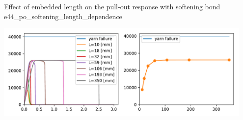 \documentclass[main.tex]{subfiles}
\begin{document}
\begin{bmcsex}{Effect of embedded length on the pull-out response with softening bond
    }{e44_po_softening_length_dependence}
\begin{center}
    \includegraphics[width=0.95\textwidth]{examples/e44_po_softening_length_dependence/fig_length_dependence.pdf}
    \end{center}
            \end{bmcsex}
\end{document}
